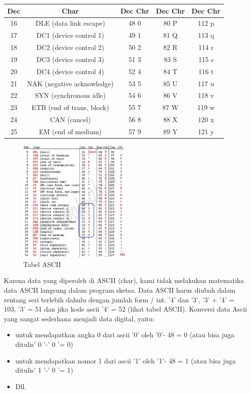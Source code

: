 \begin{table}[H]
\begin{tabular}{|c|c|c|c|c|}
\hline
Dec & Char & Dec Chr & Dec Chr & Dec Chr\\
\hline
16   & DLE (data link escape) & 48 0 & 80 P & 112 p\\
17   & DC1 (device control 1) & 49 1 & 81 Q & 113 q\\
18   & DC2 (device control 2) & 50 2 & 82 R & 114 r\\
19   & DC3 (device control 3) & 51 3 & 83 S & 115 s\\
20	 & DC4 (device control 4) & 52 4 & 84 T & 116 t\\
21	 & NAK (negative acknowledge) & 53 5 & 85 U & 117 u\\
22	 & SYN (synchronous idle) & 54 6 & 86 V & 118 v\\
23	 & ETB (end of trans, block) & 55 7 & 87 W & 119 w\\
24	 & CAN (cancel) & 56 8 & 88 X & 120 x\\
25   & EM (end of medium) & 57 9 & 89 Y & 121 y\\
\hline
\end{tabular}
\end{table}

\begin{figure}[ht]
\centerline{\includegraphics[width=0.5\textwidth]{figures/tabel.jpg}}
\caption{Tabel ASCII}
\label{tabel}
\end{figure}

Karena data yang diperoleh di ASCII (char), kami tidak melakukan matematika data ASCII langsung dalam program sketsa. Data ASCII harus diubah dalam rentang seri terlebih dahulu dengan jumlah form / int. '4' dan '3', '3' + '4' = 103, '3' = 51 dan jika kode ascii '4' = 52 (lihat tabel ASCII).
Konversi data Ascii yang sangat sederhana menjadi data digital, yaitu:
\begin{itemize}

\item untuk mendapatkan angka 0 dari ascii '0' oleh '0'- 48 = 0 (atau bisa juga ditulis' 0 '-' 0 '= 0)
\item untuk mendapatkan nomor 1 dari ascii '1' oleh '1'- 48 = 1 (atau bisa juga ditulis' 1 '-' 0 '= 1)
\item Dll.

\end{itemize}

